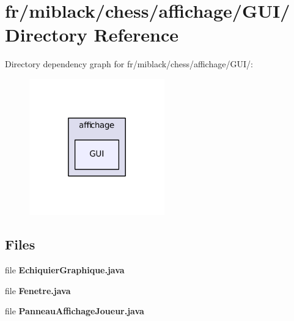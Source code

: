 \section{fr/miblack/chess/affichage/\-G\-U\-I/ Directory Reference}
\label{dir_b5c3c4ade8a5595b0d17e10b28a4497f}
Directory dependency graph for fr/miblack/chess/affichage/\-G\-U\-I/\-:
\nopagebreak
\begin{figure}[H]
\begin{center}
\leavevmode
\includegraphics[width=166pt]{dir_b5c3c4ade8a5595b0d17e10b28a4497f_dep}
\end{center}
\end{figure}
\subsection*{Files}
\begin{DoxyCompactItemize}
\item 
file {\bf Echiquier\-Graphique.\-java}
\item 
file {\bf Fenetre.\-java}
\item 
file {\bf Panneau\-Affichage\-Joueur.\-java}
\end{DoxyCompactItemize}
